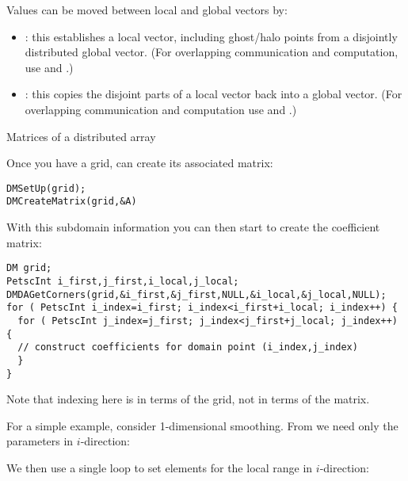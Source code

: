 Values can be moved between local and global vectors by:
\begin{itemize}
\item {}: this establishes a local vector,
  including ghost/halo points from a disjointly distributed global vector.
  (For overlapping communication and computation, use
   and .)
\item {}: this copies the disjoint parts
  of a local vector back into a global vector.
  (For overlapping communication and computation use
   and .)
\end{itemize}

 {Matrices of a distributed array}

Once you have a grid, can create its associated matrix:
\begin{lstlisting}
DMSetUp(grid);
DMCreateMatrix(grid,&A)
\end{lstlisting}

With this subdomain information you can then start to create the coefficient matrix:
\begin{lstlisting}
DM grid;
PetscInt i_first,j_first,i_local,j_local;
DMDAGetCorners(grid,&i_first,&j_first,NULL,&i_local,&j_local,NULL);
for ( PetscInt i_index=i_first; i_index<i_first+i_local; i_index++) {
  for ( PetscInt j_index=j_first; j_index<j_first+j_local; j_index++) {
  // construct coefficients for domain point (i_index,j_index)
  }
}
\end{lstlisting}
Note that indexing here is in terms of the grid, not in terms of the matrix.

For a simple example, consider 1-dimensional smoothing.
From  we need only the parameters in $i$-direction:
%

We then use a single loop to set elements for the local range in $i$-direction:
%

